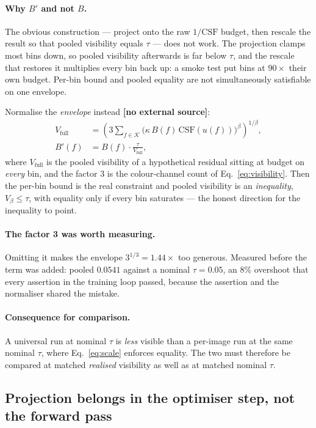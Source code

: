 \documentclass[11pt,a4paper]{article}
\newcommand{\novel}{\textbf{[no external source]}}
\begin{document}
\paragraph{Why $B'$ and not $B$.}
The obvious construction --- project onto the raw $1/\mathrm{CSF}$ budget,
then rescale the result so that pooled visibility equals $\tau$ --- does not
work. The projection clamps most bins down, so pooled visibility afterwards
is far below $\tau$, and the rescale that restores it multiplies every bin
back up: a smoke test put bins at $90\times$ their own budget. Per-bin bound
and pooled equality are not simultaneously satisfiable on one envelope.

Normalise the \emph{envelope} instead \novel{}:
\begin{align}
  V_{\mathrm{full}} &= \left(3\sum_{f\in\mathcal{K}}
     \Big(\kappa\,B(f)\,\mathrm{CSF}(u(f))\Big)^{\beta}\right)^{1/\beta},
     \label{eq:vfull}\\
  B'(f) &= B(f)\cdot\frac{\tau}{V_{\mathrm{full}}},
     \label{eq:normbudget}
\end{align}
where $V_{\mathrm{full}}$ is the pooled visibility of a hypothetical
residual sitting at budget on \emph{every} bin, and the factor $3$ is the
colour-channel count of Eq.~\eqref{eq:visibility}. Then the per-bin bound is
the real constraint and pooled visibility is an \emph{inequality},
$V_\beta\le\tau$, with equality only if every bin saturates --- the honest
direction for the inequality to point.

\paragraph{The factor 3 was worth measuring.}
Omitting it makes the envelope $3^{1/3}=1.44\times$ too generous. Measured
before the term was added: pooled $0.0541$ against a nominal $\tau=0.05$, an
$8\%$ overshoot that every assertion in the training loop passed, because
the assertion and the normaliser shared the mistake.

\paragraph{Consequence for comparison.}
A universal run at nominal $\tau$ is \emph{less} visible than a per-image
run at the same nominal $\tau$, where Eq.~\eqref{eq:scale} enforces equality.
The two must therefore be compared at matched \emph{realised} visibility as
well as at matched nominal $\tau$.

\subsection{Projection belongs in the optimiser step, not the forward pass}
\end{document}
